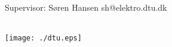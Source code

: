 \begin{titlepage}
\centering \parindent=0pt

 \HRule\\[1cm]\Huge
\course\\[0.7cm] 
\large 
Supervisor: Søren Hansen sh@elektro.dtu.dk
\HRule\\[4cm]  
\name\\
\stnumber

 \normalsize %
\begin{flushleft}

\date \end{flushleft}
 \normalsize
\begin{flushright}
\texttt{[image: ./dtu.eps]}\\
\end{flushright}
\end{titlepage}
